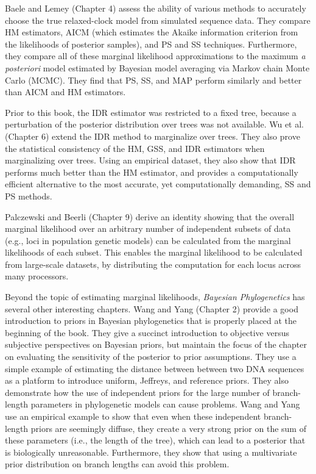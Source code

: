 \documentclass[letterpaper,12pt]{article}
\newcommand{\booktitle}{\textit{Bayesian Phylogenetics}\xspace}
\begin{document}
Baele and Lemey (Chapter 4) assess the ability of various methods to accurately
choose the true relaxed-clock model from simulated sequence data.
They compare HM estimators, AICM (which estimates the Akaike information criterion
from the likelihoods of posterior samples), and PS and SS techniques.
Furthermore, they compare all of these marginal likelihood approximations to
the maximum \emph{a posteriori} model estimated by Bayesian model averaging via
Markov chain Monte Carlo (MCMC).
They find that PS, SS, and MAP perform similarly and better than AICM and HM
estimators.

Prior to this book,
the IDR estimator was restricted to a fixed tree, because a perturbation of the
posterior distribution over trees was not available.
Wu et al. (Chapter 6) extend the IDR method to marginalize over trees.
They also prove the statistical consistency of the HM, GSS, and IDR estimators
when marginalizing over trees.
Using an empirical dataset, they also show that IDR performs much better than
the HM estimator, and provides a computationally efficient alternative to the
most accurate, yet computationally demanding, SS and PS methods.

Palczewski and Beerli (Chapter 9) derive an identity showing that the overall
marginal likelihood over an arbitrary number of independent subsets of 
data (e.g., loci in population genetic models) can be calculated from
the marginal likelihoods of each subset. 
This enables the marginal likelihood to be calculated from large-scale
datasets, by distributing the computation for each locus across many
processors.

Beyond the topic of estimating marginal likelihoods, \booktitle has several
other interesting chapters.
Wang and Yang (Chapter 2) provide a good introduction to priors in Bayesian
phylogenetics that is properly placed at the beginning of the book.
They give a succinct introduction to objective versus subjective perspectives
on Bayesian priors, but maintain the focus of the chapter on evaluating the
sensitivity of the posterior to prior assumptions.
They use a simple example of estimating the distance between between two DNA
sequences as a platform to introduce uniform, Jeffreys, and reference priors.
They also demonstrate how the use of independent priors for the large number of
branch-length parameters in phylogenetic models can cause problems.
Wang and Yang use an empirical example to show that even when these independent
branch-length priors are seemingly diffuse, they create a very strong prior on
the sum of these parameters (i.e., the length of the tree), which can lead to a
posterior that is biologically unreasonable.
Furthermore, they show that using a multivariate prior distribution on branch
lengths can avoid this problem.
\end{document}
